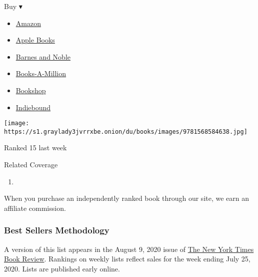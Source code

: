 \begin{enumerate}
  Buy ▾

  \begin{itemize}
  \tightlist
  \item
    \href{https://www.amazon.com/Stamped-Beginning-Definitive-History-National/dp/1568584636?tag=NYTBS-20}{Amazon}
  \item
    \href{https://du-gae-books-dot-nyt-du-prd.appspot.com/buy?title=STAMPED+FROM+THE+BEGINNING\&author=Ibram+X+Kendi}{Apple
    Books}
  \item
    \href{https://www.anrdoezrs.net/click-7990613-11819508?url=https\%3A\%2F\%2Fwww.barnesandnoble.com\%2Fw\%2F\%3Fean\%3D9781568585987}{Barnes
    and Noble}
  \item
    \href{https://www.anrdoezrs.net/click-7990613-35140?url=https\%3A\%2F\%2Fwww.booksamillion.com\%2Fp\%2FSTAMPED\%2BFROM\%2BTHE\%2BBEGINNING\%2FIbram\%2BX\%2BKendi\%2F9781568585987}{Books-A-Million}
  \item
    \href{https://bookshop.org/a/3546/9781568585987}{Bookshop}
  \item
    \href{https://www.indiebound.org/book/9781568585987?aff=NYT}{Indiebound}
  \end{itemize}

  \texttt{[image: https://s1.graylady3jvrrxbe.onion/du/books/images/9781568584638.jpg]}

  Ranked 15 last week
\end{enumerate}

Related Coverage

\begin{enumerate}
\def\labelenumi{\arabic{enumi}.}
\tightlist
\item
  \href{https://www.nytimes3xbfgragh.onion/2020/07/31/books/review/the-system-robert-reich-break-em-up-zephyr-teachout.html}{}
\end{enumerate}

When you purchase an independently ranked book through our site, we earn
an affiliate commission.

\hypertarget{best-sellers-methodology}{%
\subsubsection{Best Sellers
Methodology}\label{best-sellers-methodology}}

A version of this list appears in the August 9, 2020 issue of
\href{http://www.nytimes3xbfgragh.onion/section/books/review}{The New
York Times Book Review}. Rankings on weekly lists reflect sales for the
week ending July 25, 2020. Lists are published early online.

